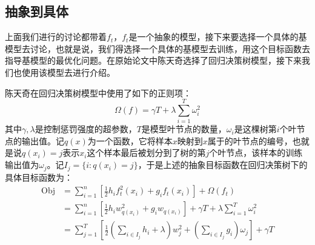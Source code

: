 \subsection{抽象到具体}
上面我们进行的讨论都带着$f_t$，$f_t$是一个抽象的模型，接下来要选择一个具体的基模型去讨论，也就是说，我们得选择一个具体的基模型去训练，用这个目标函数去指导基模型的最优化问题。在原始论文中陈天奇选择了回归决策树模型，接下来我们也使用该模型去进行介绍。\par
陈天奇在回归决策树模型中使用了如下的正则项：
\begin{equation*}
	\Omega(f)=\gamma T+\lambda\sum_{i=1}^{T}\omega_i^2
\end{equation*}
其中$\gamma,\lambda$是控制惩罚强度的超参数，$T$是模型叶节点的数量，$\omega_i$是这棵树第$i$个叶节点的输出值。记$q(x)$为一个函数，它将样本$x$映射到$x$属于的叶节点的编号，也就是说$q(x_i)=j$表示$x_i$这个样本最后被划分到了树的第$j$个叶节点，该样本的训练输出值为$\omega_j$。记$I_j=\{i:q(x_i)=j\}$，于是上述的抽象目标函数在回归决策树下的具体目标函数为：
\begin{align*}
	\operatorname{Obj}
	&=\sum_{i=1}^{n}\left[\frac{1}{2}h_if_t^2(x_i)+g_if_t(x_i)\right]+\Omega(f_t) \\
	&=\sum_{i=1}^{n}\left[\frac{1}{2}h_iw_{q(x_i)}^2+g_iw_{q(x_i)}\right]+\gamma T+\lambda\sum_{i=1}^{T}\omega_i^2 \\
	&=\sum_{j=1}^{T}\left[\frac{1}{2}\left(\sum_{i\in I_j}h_i+\lambda\right)w_j^2+\left(\sum_{i\in I_j}g_i\right)\omega_j\right]+\gamma T
\end{align*}


